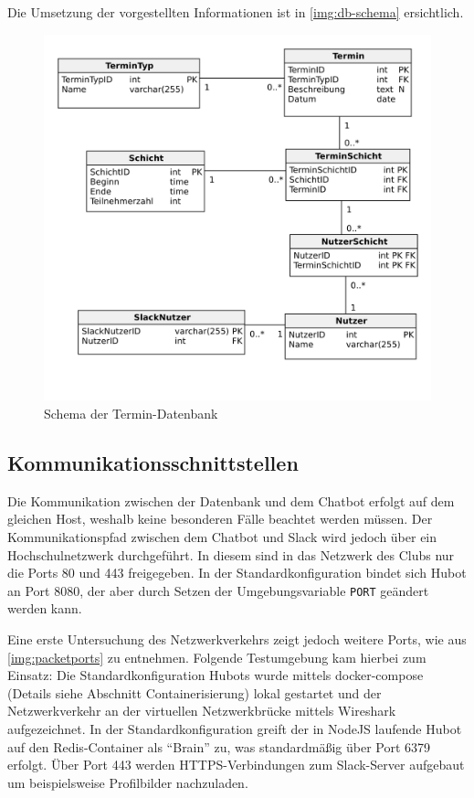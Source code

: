 Die Umsetzung der vorgestellten Informationen ist in \autoref{img:db-schema} ersichtlich.



\begin{figure}[htbp]
    \centering
    \includegraphics[width=\textwidth]{../docs/uml/Steckerbot-DB.png}
    \caption{Schema der Termin-Datenbank}
    \label{img:db-schema}
\end{figure}


\subsection{Kommunikationsschnittstellen}

Die Kommunikation zwischen der Datenbank und dem Chatbot erfolgt auf dem gleichen Host, weshalb keine besonderen Fälle beachtet werden müssen. Der Kommunikationspfad zwischen dem Chatbot und Slack wird jedoch über ein Hochschulnetzwerk durchgeführt. In diesem sind in das Netzwerk des Clubs nur die Ports 80 und 443 freigegeben. In der Standardkonfiguration bindet sich Hubot an Port 8080, der aber durch Setzen der Umgebungsvariable \texttt{PORT} geändert werden kann.

Eine erste Untersuchung des Netzwerkverkehrs zeigt jedoch weitere Ports, wie aus \autoref{img:packetports} zu entnehmen. Folgende Testumgebung kam hierbei zum Einsatz:
Die Standardkonfiguration Hubots wurde mittels docker-compose (Details siehe Abschnitt Containerisierung) lokal gestartet und der Netzwerkverkehr an der virtuellen Netzwerkbrücke mittels Wireshark aufgezeichnet. In der Standardkonfiguration greift der in NodeJS laufende Hubot auf den Redis-Container als \enquote{Brain} zu, was standardmäßig über Port 6379 erfolgt. Über Port 443 werden HTTPS-Verbindungen zum Slack-Server aufgebaut um beispielsweise Profilbilder nachzuladen.

